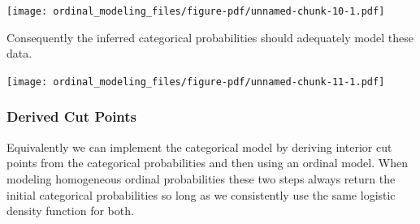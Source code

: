 \documentclass[
  letterpaper,
  DIV=11,
  numbers=noendperiod]{scrartcl}
\newenvironment{Shaded}{\begin{snugshade}}{\end{snugshade}}
\newcommand{\AttributeTok}[1]{\textcolor[rgb]{0.40,0.45,0.13}{#1}}
\newcommand{\ControlFlowTok}[1]{\textcolor[rgb]{0.00,0.23,0.31}{#1}}
\newcommand{\DecValTok}[1]{\textcolor[rgb]{0.68,0.00,0.00}{#1}}
\newcommand{\FunctionTok}[1]{\textcolor[rgb]{0.28,0.35,0.67}{#1}}
\newcommand{\NormalTok}[1]{\textcolor[rgb]{0.00,0.23,0.31}{#1}}
\newcommand{\OtherTok}[1]{\textcolor[rgb]{0.00,0.23,0.31}{#1}}
\newcommand{\SpecialCharTok}[1]{\textcolor[rgb]{0.37,0.37,0.37}{#1}}
\newcommand{\StringTok}[1]{\textcolor[rgb]{0.13,0.47,0.30}{#1}}
\begin{document}
\texttt{[image: ordinal\_modeling\_files/figure-pdf/unnamed-chunk-10-1.pdf]}

Consequently the inferred categorical probabilities should adequately
model these data.

\begin{Shaded}
\end{Shaded}

\texttt{[image: ordinal\_modeling\_files/figure-pdf/unnamed-chunk-11-1.pdf]}

\subsubsection{Derived Cut Points}\label{derived-cut-points}

Equivalently we can implement the categorical model by deriving interior
cut points from the categorical probabilities and then using an ordinal
model. When modeling homogeneous ordinal probabilities these two steps
always return the initial categorical probabilities so long as we
consistently use the same logistic density function for both.
\end{document}
